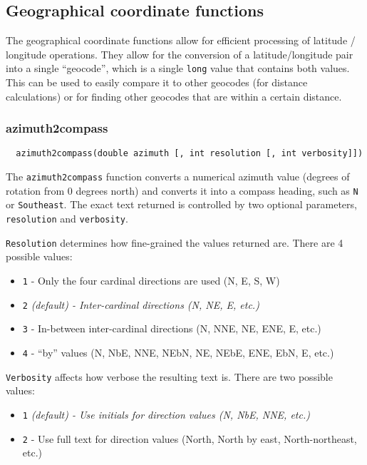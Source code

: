 \subsection{Geographical coordinate functions}

The geographical coordinate functions allow for efficient processing
of latitude / longitude operations.  They allow for the conversion of
a latitude/longitude pair into a single ``geocode'', which is a single
\verb`long` value that contains both values.  This can be used to
easily compare it to other geocodes (for distance calculations) or for
finding other geocodes that are within a certain distance.

\subsubsection{azimuth2compass}

\begin{verbatim}
  azimuth2compass(double azimuth [, int resolution [, int verbosity]])
\end{verbatim}

The \verb`azimuth2compass` function converts a numerical azimuth value
(degrees of rotation from 0 degrees north) and converts it into a
compass heading, such as \verb`N` or \verb`Southeast`.  The exact text
returned is controlled by two optional parameters, \verb`resolution`
and \verb`verbosity`.

\verb`Resolution` determines how fine-grained the values returned
are.  There are 4 possible values:

\begin{itemize}
\item \verb`1` - Only the four cardinal directions are used (N, E, S,
W)
\item \verb`2` \em{(default)} - Inter-cardinal directions (N, NE, E,
etc.)
\item \verb`3` - In-between inter-cardinal directions (N, NNE, NE, ENE,
E, etc.)
\item \verb`4` - ``by'' values (N, NbE, NNE, NEbN, NE, NEbE, ENE, EbN,
E, etc.)
\end{itemize}

\verb`Verbosity` affects how verbose the resulting text is.  There are
two possible values:

\begin{itemize}
\item \verb`1` \em{(default)} - Use initials for direction values (N,
NbE, NNE, etc.)
\item \verb`2` - Use full text for direction values (North, North by
east, North-northeast, etc.)
\end{itemize}

